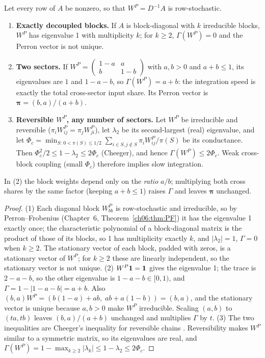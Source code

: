 \documentclass[../structural_economics_book.tex]{subfiles}
\begin{document}
\begin{proposition}\label{ch03:prop:block_spectral}
Let every row of $A$ be nonzero, so that $W^P = D^{-1}A$ is row-stochastic.
\begin{enumerate}
\item \textbf{Exactly decoupled blocks.} If $A$ is block-diagonal with $k$ irreducible blocks, $W^P$ has eigenvalue 1 with multiplicity $k$; for $k \ge 2$, $\Gamma(W^P) = 0$ and the Perron vector is not unique.
\item \textbf{Two sectors.} If $W^P = \begin{pmatrix} 1-a & a \\ b & 1-b\end{pmatrix}$ with $a, b > 0$ and $a + b \le 1$, its eigenvalues are $1$ and $1 - a - b$, so $\Gamma(W^P) = a + b$: the integration speed is exactly the total cross-sector input share. Its Perron vector is $\boldsymbol{\pi} = (b, a)/(a + b)$.
\item \textbf{Reversible $W^P$, any number of sectors.} Let $W^P$ be irreducible and reversible ($\pi_i W^P_{ij} = \pi_j W^P_{ji}$), let $\lambda_2$ be its second-largest (real) eigenvalue, and let $\Phi_c = \min_{S:\,0 < \pi(S) \le 1/2} \sum_{i \in S, j \notin S}\pi_i W^P_{ij}/\pi(S)$ be its conductance. Then $\Phi_c^2/2 \le 1 - \lambda_2 \le 2\Phi_c$ (Cheeger), and hence $\Gamma(W^P) \le 2\Phi_c$. Weak cross-block coupling (small $\Phi_c$) therefore implies slow integration.
\end{enumerate}
In (2) the block weights depend only on the \textit{ratio} $a/b$; multiplying both cross shares by the same factor (keeping $a + b \le 1$) raises $\Gamma$ and leaves $\boldsymbol{\pi}$ unchanged.
\end{proposition}

\begin{proof}
(1) Each diagonal block $W^P_{bb}$ is row-stochastic and irreducible, so by Perron--Frobenius (Chapter~6, Theorem~\ref{ch06:thm:PF}) it has the eigenvalue 1 exactly once; the characteristic polynomial of a block-diagonal matrix is the product of those of its blocks, so 1 has multiplicity exactly $k$, and $|\lambda_2| = 1$, $\Gamma = 0$ when $k \ge 2$. The stationary vector of each block, padded with zeros, is a stationary vector of $W^P$; for $k \ge 2$ these are linearly independent, so the stationary vector is not unique. (2) $W^P\mathbf{1} = \mathbf{1}$ gives the eigenvalue 1; the trace is $2 - a - b$, so the other eigenvalue is $1 - a - b \in [0, 1)$, and $\Gamma = 1 - |1 - a - b| = a + b$. Also $(b, a)W^P = (b(1-a) + ab, \; ab + a(1-b)) = (b, a)$, and the stationary vector is unique because $a, b > 0$ make $W^P$ irreducible. Scaling $(a, b)$ to $(ta, tb)$ leaves $(b, a)/(a+b)$ unchanged and multiplies $\Gamma$ by $t$. (3) The two inequalities are Cheeger's inequality for reversible chains \citep[Thm.~13.14]{levin2009markov}. Reversibility makes $W^P$ similar to a symmetric matrix, so its eigenvalues are real, and $\Gamma(W^P) = 1 - \max_{k \ge 2}|\lambda_k| \le 1 - \lambda_2 \le 2\Phi_c$.
\end{proof}
\end{document}
